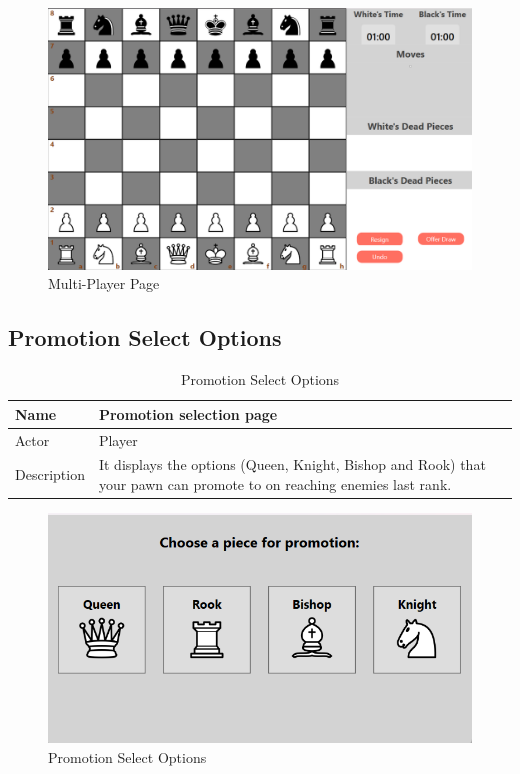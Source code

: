 \documentclass[a4paper,12pt]{article}
\begin{document}
\begin{figure}[H]
    \centering
    \includegraphics[width=0.7\linewidth]{Images/Use Cases/multiplayerPage.png}
    \caption{Multi-Player Page}
    \label{fig:multiPlayerPage}
\end{figure}
    
\subsection{Promotion Select Options}

\begin{longtable}{|m{}|m{}|}
    \caption{Promotion Select Options} \\
    \hline
    Name & Promotion selection page \\
    \hline
    Actor & Player \\
    \hline
    Description & It displays the options (Queen, Knight, Bishop and Rook) that your pawn can promote to on reaching enemies last rank.\\ 
    \hline
\end{longtable}

\begin{figure}[H]
    \centering
    \includegraphics[width=0.7\linewidth]{Images/Use Cases/promotionSelectOptions.png}
    \caption{Promotion Select Options}
    \label{fig:promotionSelectOptions}
\end{figure}
    
\end{document}
